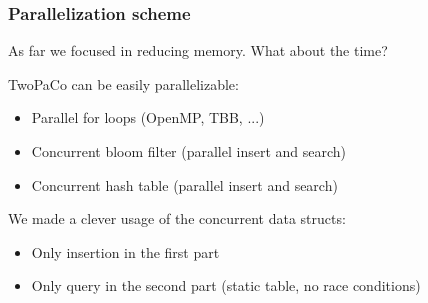 
\begin{frame}
	\frametitle{Parallelization scheme}
	\centering
	
	As far we focused in reducing memory. What about the time?
	
	\bigskip
	
	TwoPaCo can be easily parallelizable:
	
	\begin{itemize}
	  \item Parallel for loops (OpenMP, TBB, ...)
	  \item Concurrent bloom filter (parallel insert and search)
	  \item Concurrent hash table (parallel insert and search)
	\end{itemize}
	
	\medskip
	
	We made a clever usage of the concurrent data structs:
	
	\begin{itemize}
	  \item Only insertion in the first part
	  \item Only query in the second part (static table, no race conditions)
	\end{itemize}
	
	
	
\end{frame}
